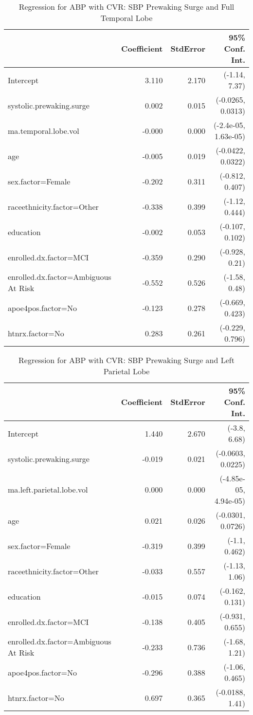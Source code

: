 \documentclass[10pt]{article}\usepackage[]{graphicx}\usepackage[]{color}
\begin{document}
\begin{table}[ht]
\centering
\caption{Regression for ABP with CVR: SBP Prewaking Surge and Full Temporal Lobe} 
\begin{tabular}{lrrr}
  \toprule
 & Coefficient & StdError & 95\% Conf. Int. \\ 
  \midrule
Intercept & 3.110 & 2.170 & (-1.14, 7.37) \\ 
  systolic.prewaking.surge & 0.002 & 0.015 & (-0.0265, 0.0313) \\ 
  ma.temporal.lobe.vol & -0.000 & 0.000 & (-2.4e-05, 1.63e-05) \\ 
  age & -0.005 & 0.019 & (-0.0422, 0.0322) \\ 
  sex.factor=Female & -0.202 & 0.311 & (-0.812, 0.407) \\ 
  raceethnicity.factor=Other & -0.338 & 0.399 & (-1.12, 0.444) \\ 
  education & -0.002 & 0.053 & (-0.107, 0.102) \\ 
  enrolled.dx.factor=MCI & -0.359 & 0.290 & (-0.928, 0.21) \\ 
  enrolled.dx.factor=Ambiguous At Risk & -0.552 & 0.526 & (-1.58, 0.48) \\ 
  apoe4pos.factor=No & -0.123 & 0.278 & (-0.669, 0.423) \\ 
  htnrx.factor=No & 0.283 & 0.261 & (-0.229, 0.796) \\ 
   \bottomrule
\end{tabular}
\end{table}
\begin{table}[ht]
\centering
\caption{Regression for ABP with CVR: SBP Prewaking Surge and Left Parietal Lobe} 
\begin{tabular}{lrrr}
  \toprule
 & Coefficient & StdError & 95\% Conf. Int. \\ 
  \midrule
Intercept & 1.440 & 2.670 & (-3.8, 6.68) \\ 
  systolic.prewaking.surge & -0.019 & 0.021 & (-0.0603, 0.0225) \\ 
  ma.left.parietal.lobe.vol & 0.000 & 0.000 & (-4.85e-05, 4.94e-05) \\ 
  age & 0.021 & 0.026 & (-0.0301, 0.0726) \\ 
  sex.factor=Female & -0.319 & 0.399 & (-1.1, 0.462) \\ 
  raceethnicity.factor=Other & -0.033 & 0.557 & (-1.13, 1.06) \\ 
  education & -0.015 & 0.074 & (-0.162, 0.131) \\ 
  enrolled.dx.factor=MCI & -0.138 & 0.405 & (-0.931, 0.655) \\ 
  enrolled.dx.factor=Ambiguous At Risk & -0.233 & 0.736 & (-1.68, 1.21) \\ 
  apoe4pos.factor=No & -0.296 & 0.388 & (-1.06, 0.465) \\ 
  htnrx.factor=No & 0.697 & 0.365 & (-0.0188, 1.41) \\ 
   \bottomrule
\end{tabular}
\end{table}
\end{document}
